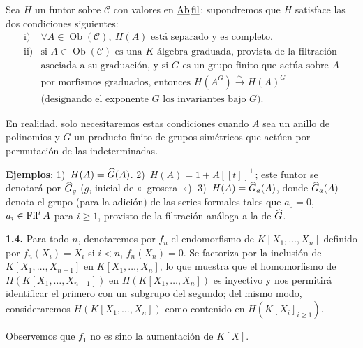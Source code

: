 Sea \(H\) un funtor sobre \(\mathcal C\) con valores en \(\underline{\mathrm{Ab}}\,\underline{\mathrm{fil}}\); supondremos que \(H\) satisface las dos condiciones siguientes:
\[
\begin{array}{ll}
\text{i)} & \forall A\in\operatorname{Ob}(\mathcal C),\ H(A)\text{ está separado y es completo}.\\[0.3em]
\text{ii)} & \text{si }A\in\operatorname{Ob}(\mathcal C)\text{ es una }K\text{-álgebra graduada, provista de la filtración}\\
& \text{asociada a su graduación, y si }G\text{ es un grupo finito que actúa sobre }A\\
& \text{por morfismos graduados, entonces }H(A^G)\xrightarrow{\sim} H(A)^G\\
& \text{(designando el exponente }G\text{ los invariantes bajo }G\text{).}
\end{array}
\]

En realidad, solo necesitaremos estas condiciones cuando \(A\) sea un anillo de polinomios y \(G\) un producto finito de grupos simétricos que actúen por permutación de las indeterminadas.

\textbf{Ejemplos}: 1)~\(H(A)=\widehat G(A)\). 2)~\(H(A)=1+A[[t]]^+\); este funtor se denotará por \(\widehat G_g\) (\(g\), inicial de «~grosera~»). 3)~\(H(A)=\widehat G_a(A)\), donde \(\widehat G_a(A)\) denota el grupo (para la adición) de las series formales tales que \(a_0=0\), \(a_i\in\operatorname{Fil}^i A\) para \(i\geq 1\), provisto de la filtración análoga a la de \(\widehat G\).

\textbf{1.4.} Para todo \(n\), denotaremos por \(f_n\) el endomorfismo de \(K[X_1,\ldots,X_n]\) definido por \(f_n(X_i)=X_i\) si \(i<n\), \(f_n(X_n)=0\). Se factoriza por la inclusión de \(K[X_1,\ldots,X_{n-1}]\) en \(K[X_1,\ldots,X_n]\), lo que muestra que el homomorfismo de \(H(K[X_1,\ldots,X_{n-1}])\) en \(H(K[X_1,\ldots,X_n])\) es inyectivo y nos permitirá identificar el primero con un subgrupo del segundo; del mismo modo, consideraremos \(H(K[X_1,\ldots,X_n])\) como contenido en \(H(K[X_i]_{i\geq 1})\).

Observemos que \(f_1\) no es sino la aumentación de \(K[X]\).

